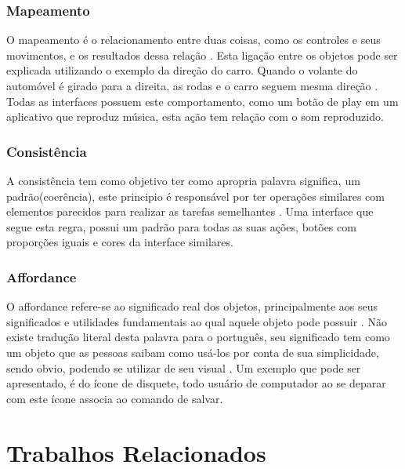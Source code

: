 \documentclass[12pt,oneside,a4paper,chapter=TITLE,section=TITLE,sumario=tradicional]{abntex2}
\begin{document}
\subsection{Mapeamento}
\label{sec:mapeamento}

O mapeamento é o relacionamento entre duas coisas, como os controles e seus movimentos, e os resultados dessa relação \cite{norman2002}. Esta ligação entre os objetos pode ser explicada utilizando o exemplo da direção do carro. Quando o volante do automóvel é girado para a direita, as rodas e o carro seguem mesma direção \cite{norman2002}. Todas as interfaces possuem este comportamento, como um botão de play em um aplicativo que reproduz música, esta ação tem relação com o som reproduzido.

\subsection{Consistência}
\label{sec:consciencia}

A consistência tem como objetivo ter como apropria palavra significa, um padrão(coerência), este principio é responsável por ter operações similares com elementos parecidos para realizar as tarefas semelhantes \cite{agni2015}. Uma interface que segue esta regra, possui um padrão para todas as suas ações, botões com proporções iguais e cores da interface similares.

\subsection{Affordance}
\label{sec:affordance}

O affordance refere-se ao significado real dos objetos, principalmente aos seus significados e utilidades fundamentais ao qual aquele objeto pode possuir \cite{norman2002}. Não existe tradução literal desta palavra para o português, seu significado tem como um objeto que as pessoas saibam como usá-los por conta de sua simplicidade, sendo obvio, podendo se utilizar de seu visual \cite{agni2015}. Um exemplo que pode ser apresentado, é do ícone de disquete, todo usuário de computador ao se deparar com este ícone associa ao comando de salvar.

\chapter{Trabalhos Relacionados}
\label{cap:trabalhos-relacionados}
\end{document}
